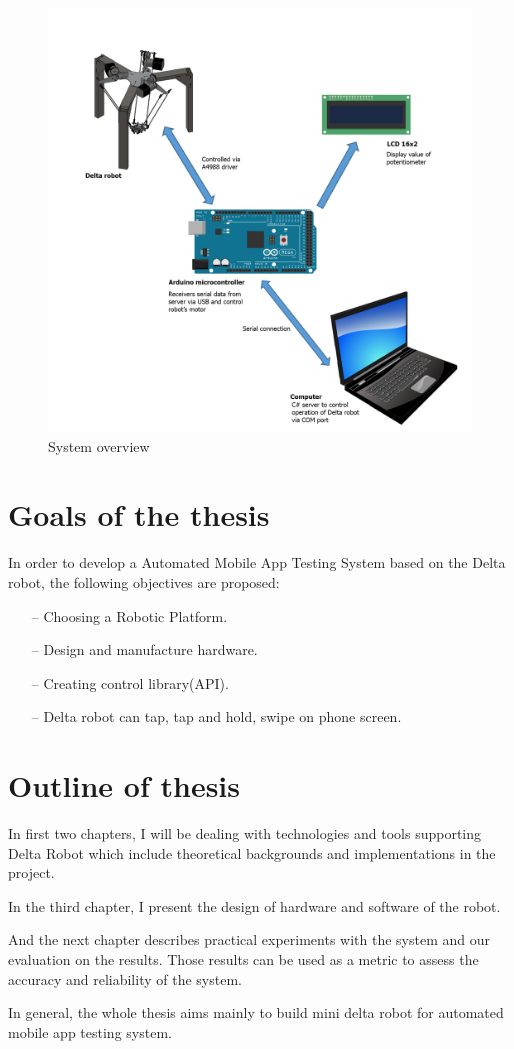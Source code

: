 \begin{figure}[H]
	\centering
	\includegraphics[width=\maxwidth{15cm}, keepaspectratio]{Chapters/Fig/system_overview.png}
	\caption{System overview}
	\label{fig:system_overview}
\end{figure}

\section{Goals of the thesis}
In order to develop a Automated Mobile App Testing System based on the Delta robot, the following objectives are proposed:
	\begin{itemize}
		\item[--] Choosing a Robotic Platform.
		\item[--] Design and manufacture hardware.
		\item[--] Creating control library(API). 
		\item[--] Delta robot can tap, tap and hold, swipe on phone screen.
	\end{itemize}

\section{Outline of thesis}

In first two chapters, I will be dealing with technologies and tools supporting Delta Robot which include theoretical backgrounds and implementations in the project.

In the third chapter, I present the design of hardware and software of the robot.

And the next chapter describes practical experiments with the system and our evaluation on the results. Those results can be used as a metric to assess the accuracy and reliability of the system.

In general, the whole thesis aims mainly to build mini delta robot for automated mobile app testing system. \nocite{radim_thesis}